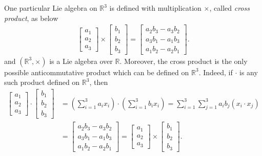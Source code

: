 \documentclass[11pt]{book}
\theoremstyle{definition}
\numberwithin{equation}{chapter}
\begin{document}
One particular Lie algebra on $\mathbb{R}^3$ is defined with multiplication $\times$, called \emph{cross product}, as below
\begin{align*}
    \begin{bmatrix}
    a_1 \\
    a_2 \\
    a_3
    \end{bmatrix} \times 
    \begin{bmatrix}
    b_1 \\
    b_2 \\
    b_3
    \end{bmatrix} = 
    \begin{bmatrix}
    a_2 b_3 - a_3 b_2 \\
    a_3 b_1 - a_1 b_3 \\
    a_1 b_2 - a_2 b_1
    \end{bmatrix}.
\end{align*}
and $(\mathbb{R}^3,\times)$ is a Lie algebra over $\mathbb{R}$. Moreover, the cross product is the only possible anticommutative product which can be defined on $\mathbb{R}^3$. Indeed, if $\cdot$ is any such product defined on $\mathbb{R}^3$, then 
\begin{align*}
    \begin{bmatrix}
    a_1 \\
    a_2 \\
    a_3
    \end{bmatrix}\cdot 
    \begin{bmatrix}
    b_1 \\
    b_2 \\
    b_3
    \end{bmatrix} & = \left(\sum^3_{i=1} a_i x_i\right)\cdot \left(\sum^3_{i=1} b_i x_i\right) = \sum^3_{i=1}\sum^3_{j=1} a_i b_j (x_i\cdot x_j)\\
    & = \begin{bmatrix}
    a_2 b_3 - a_3 b_2 \\
    a_3 b_1 - a_1 b_3 \\
    a_1 b_2 - a_2 b_1
    \end{bmatrix} = \begin{bmatrix}
    a_1 \\
    a_2 \\
    a_3
    \end{bmatrix} \times 
    \begin{bmatrix}
    b_1 \\
    b_2 \\
    b_3
    \end{bmatrix}.
\end{align*}
\end{document}
